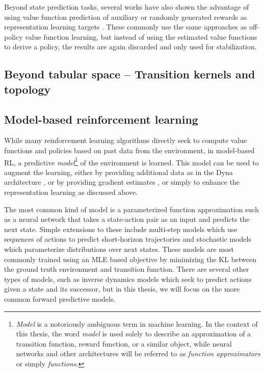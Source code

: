 Beyond state prediction tasks, several works have also shown the advantage of using value function prediction of auxiliary or randomly generated rewards as representation learning targets \parencite{lyle2021effect,farebrother2023protovalue}.
These commonly use the same approaches as off-policy value function learning, but instead of using the estimated value functions to derive a policy, the results are again discarded and only used for stabilization.


\subsection{Beyond tabular space -- Transition kernels and topology}

\subsection{Model-based reinforcement learning}
\label{sec:model_learning}

While many reinforcement learning algorithms directly seek to compute value functions and policies based on past data from the environment, in model-based RL, a predictive \emph{model}\footnote{\emph{Model} is a notoriously ambiguous term in machine learning. In the context of this thesis, the word \emph{model} is used solely to describe an approximation of a transition function, reward function, or a similar object, while neural networks and other architectures will be referred to as \emph{function approximators} or simply \emph{functions}.} of the environment is learned.
This model can be used to augment the learning, either by providing additional data as in the Dyna architecture \parencite{dyna}, or by providing gradient estimates \parencite{Hafner2020Dream,amos2021modelbased}, or simply to enhance the representation learning as discussed above.

The most common kind of model is a parameterized function approximation such as a neural network that takes a state-action pair as an input and predicts the next state.
Simple extensions to these include multi-step models which use sequences of actions to predict short-horizon trajectories and stochastic models which parameterize distributions over next states.
These models are most commonly trained using an MLE based objective by minimizing the KL between the ground truth environment and transition function.
There are several other types of models, such as inverse dynamics models which seek to predict actions given a state and its successor, but in this thesis, we will focus on the more common forward predictive models.

